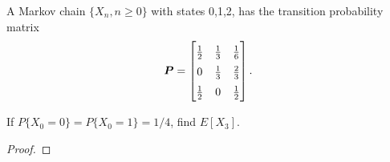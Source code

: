 \begin{problem}{4.5}
  A Markov chain $\{X_n, n \geq 0\}$ with states 0,1,2, has the transition
  probability matrix
  \begin{align*}
    \renewcommand\arraystretch{1.5}
    \boldsymbol{P} =
    \begin{bmatrix}
      \frac{1}{2} & \frac{1}{3} & \frac{1}{6} \\
      0 & \frac{1}{3} & \frac{2}{3} \\
      \frac{1}{2} & 0 & \frac{1}{2} \\
    \end{bmatrix}.
  \end{align*}

  If $P\{X_0 = 0\} = P\{X_0 = 1\} = 1/4$, find $E[X_3]$.
\end{problem}

\begin{proof}
\end{proof}
\newpage
